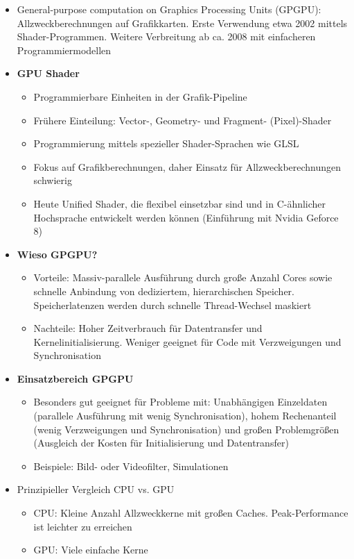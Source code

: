 \begin{itemize}
	\item General-purpose computation on Graphics Processing Units (GPGPU): Allzweckberechnungen auf Grafikkarten. Erste Verwendung etwa 2002 mittels Shader-Programmen. Weitere Verbreitung ab ca. 2008 mit einfacheren Programmiermodellen
	\item \textbf{GPU Shader}
	\begin{itemize}
		\item Programmierbare Einheiten in der Grafik-Pipeline
		\item Frühere Einteilung: Vector-, Geometry- und Fragment- (Pixel)-Shader
		\item Programmierung mittels spezieller Shader-Sprachen wie GLSL
		\item Fokus auf Grafikberechnungen, daher Einsatz für Allzweckberechnungen schwierig
		\item Heute Unified Shader, die flexibel einsetzbar sind und in C-ähnlicher Hochsprache entwickelt werden können (Einführung mit Nvidia Geforce 8)
	\end{itemize}
	\item \textbf{Wieso GPGPU?}
	\begin{itemize}
		\item Vorteile: Massiv-parallele Ausführung durch große Anzahl Cores sowie schnelle Anbindung von dediziertem, hierarchischen Speicher. Speicherlatenzen werden durch schnelle Thread-Wechsel maskiert
		\item Nachteile: Hoher Zeitverbrauch für Datentransfer und Kernelinitialisierung. Weniger geeignet für Code mit Verzweigungen und Synchronisation
	\end{itemize}
	\item \textbf{Einsatzbereich GPGPU}
	\begin{itemize}
		\item Besonders gut geeignet für Probleme mit: Unabhängigen Einzeldaten (parallele Ausführung mit wenig Synchronisation), hohem Rechenanteil (wenig Verzweigungen und Synchronisation) und großen Problemgrößen (Ausgleich der Kosten für Initialisierung und Datentransfer)
		\item Beispiele: Bild- oder Videofilter, Simulationen
	\end{itemize}
	\item Prinzipieller Vergleich CPU vs. GPU
	\begin{itemize}
		\item CPU: Kleine Anzahl Allzweckkerne mit großen Caches. Peak-Performance ist leichter zu erreichen
		\item GPU: Viele einfache Kerne
	\end{itemize}
\end{itemize}



